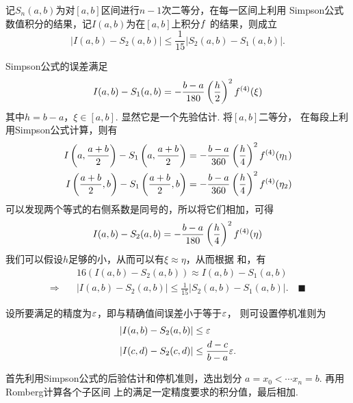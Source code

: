   \begin{thm}[Simpson公式的后验估计]
    记$S_n(a, b)$为对$[a, b]$区间进行$n-1$次二等分，在每一区间上利用
    Simpson公式数值积分的结果，记$I(a, b)$为在$[a, b]$上积分$\mathnormal{f}$
    的结果，则成立
    \[
      \left| I(a, b) - S_2(a, b) \right|
      \le \frac{1}{15}| S_2(a, b) - S_1(a, b)|.
    \]
  \end{thm}
  \proof
    Simpson公式的误差满足
    \begin{equation}
      \label{equ: Simpson公式误差}
      I(a, b) - S_1(a, b) = -\frac{b-a}{180}\left(\frac{h}{2}\right)^2\mathnormal{f}^{(4)}(\xi)
    \end{equation}
    其中$h = b-a$，$\xi\in[a, b]$. 显然它是一个先验估计. 将$[a, b]$二等分，
    在每段上利用Simpson公式计算，则有
    \[\begin{split}
      I\left(a, \frac{a+b}{2}\right) - S_1\left(a, \frac{a+b}{2}\right)
      & = -\frac{b-a}{360}\left(\frac{h}{4}\right)^2\mathnormal{f}^{(4)}(\eta_1) \\
      I\left(\frac{a+b}{2}, b\right) - S_1\left(\frac{a+b}{2}, b\right)
      & = -\frac{b-a}{360}\left(\frac{h}{4}\right)^2\mathnormal{f}^{(4)}(\eta_2)
    \end{split}\]
    可以发现两个等式的右侧系数是同号的，所以将它们相加，可得
    \begin{equation}
      \label{equ: Simpson2公式误差}
      I(a, b) - S_2(a, b) = -\frac{b-a}{180}\left(\frac{h}{4}\right)^2\mathnormal{f}^{(4)}(\eta)
    \end{equation}
    我们可以假设$h$足够的小，从而可以有$\xi\approx\eta$，从而根据
    和，有
    \[\begin{split}
       &16(I(a, b) - S_2(a, b)) \approx I(a, b) - S_1(a, b) \\
      \Rightarrow\quad& |I(a, b) - S_2(a, b)| \le \frac{1}{15}|S_2(a, b) - S_1(a, b)|.
      \quad\blacksquare
    \end{split}\]

  \begin{thm}[停机准则]
    设所要满足的精度为$\varepsilon$，即与精确值间误差小于等于$\varepsilon$，
    则可设置停机准则为
    \[\begin{split}
      |I(a, b) - S_2(a, b)| &\le \varepsilon \\
      |I(c, d) - S_2(c, d)| &\le \frac{d-c}{b-a}\varepsilon.
    \end{split}\]
  \end{thm}

  \begin{alg}[自适应方法]
    首先利用Simpson公式的后验估计和停机准则，选出划分
    $a = x_0 < \cdots x_n = b$. 再用Romberg计算各个子区间
    上的满足一定精度要求的积分值，最后相加. \par
  \end{alg}

